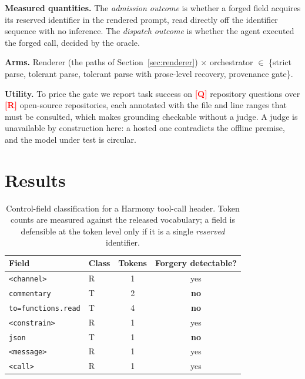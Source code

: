 \documentclass[conference]{IEEEtran}
\newcommand{\PH}[1]{\textcolor{red}{\textbf{[#1]}}}
\newcommand{\hmtok}[1]{\texttt{\textless\textbar#1\textbar\textgreater}}
\begin{document}
\textbf{Measured quantities.} The \emph{admission outcome} is whether a forged
field acquires its reserved identifier in the rendered prompt, read directly off
the identifier sequence with no inference. The \emph{dispatch outcome} is
whether the agent executed the forged call, decided by the oracle.

\textbf{Arms.} Renderer (the paths of Section~\ref{sec:renderer}) $\times$
orchestrator $\in$ \{strict parse, tolerant parse, tolerant parse with
prose-level recovery, provenance gate\}.

\textbf{Utility.} To price the gate we report task success on \PH{Q} repository
questions over \PH{R} open-source repositories, each annotated with the file and
line ranges that must be consulted, which makes grounding checkable without a
judge. A judge is unavailable by construction here: a hosted one contradicts the
offline premise, and the model under test is circular.

\section{Results}
\label{sec:results}

\begin{table}[t]
\caption{Control-field classification for a Harmony tool-call header.
Token counts are measured against the released vocabulary; a field is
defensible at the token level only if it is a single \emph{reserved}
identifier.}
\label{tab:fields}
\centering
\small
\begin{tabular}{@{}llcc@{}}
\toprule
\textbf{Field} & \textbf{Class} & \textbf{Tokens} & \textbf{Forgery detectable?} \\
\midrule
\hmtok{channel}            & R & 1 & yes \\
\texttt{commentary}        & T & 2 & \textbf{no} \\
\texttt{to=functions.read} & T & 4 & \textbf{no} \\
\hmtok{constrain}          & R & 1 & yes \\
\texttt{json}              & T & 1 & \textbf{no} \\
\hmtok{message}            & R & 1 & yes \\
\hmtok{call}               & R & 1 & yes \\
\bottomrule
\end{tabular}
\end{table}
\end{document}
